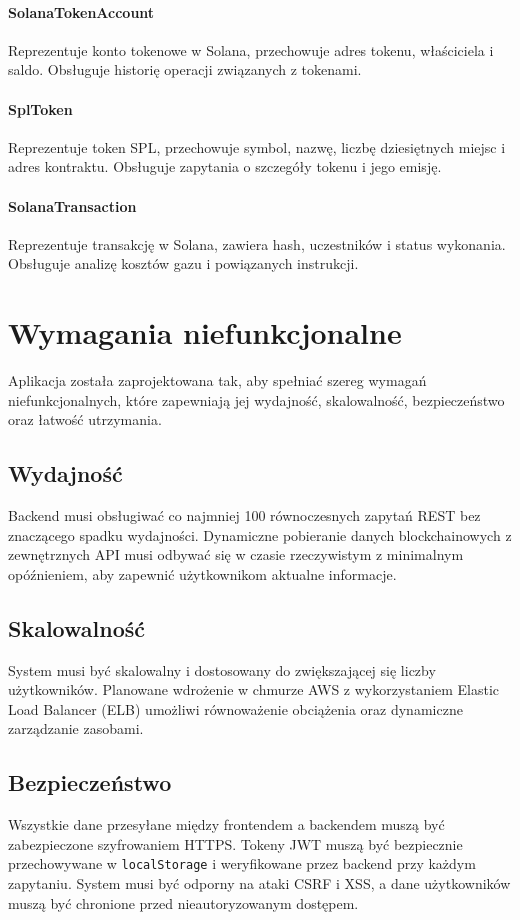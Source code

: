 \paragraph{SolanaTokenAccount} Reprezentuje konto tokenowe w Solana, przechowuje adres tokenu, właściciela i saldo. Obsługuje historię operacji związanych z tokenami.

\paragraph{SplToken} Reprezentuje token SPL, przechowuje symbol, nazwę, liczbę dziesiętnych miejsc i adres kontraktu. Obsługuje zapytania o szczegóły tokenu i jego emisję.

\paragraph{SolanaTransaction} Reprezentuje transakcję w Solana, zawiera hash, uczestników i status wykonania. Obsługuje analizę kosztów gazu i powiązanych instrukcji.




\section{Wymagania niefunkcjonalne}

Aplikacja została zaprojektowana tak, aby spełniać szereg wymagań niefunkcjonalnych, które zapewniają jej wydajność, skalowalność, bezpieczeństwo oraz łatwość utrzymania.

\subsection{Wydajność}
Backend musi obsługiwać co najmniej 100 równoczesnych zapytań REST bez znaczącego spadku wydajności. Dynamiczne pobieranie danych blockchainowych z zewnętrznych API musi odbywać się w czasie rzeczywistym z minimalnym opóźnieniem, aby zapewnić użytkownikom aktualne informacje.

\subsection{Skalowalność}
System musi być skalowalny i dostosowany do zwiększającej się liczby użytkowników. Planowane wdrożenie w chmurze AWS z wykorzystaniem Elastic Load Balancer (ELB) umożliwi równoważenie obciążenia oraz dynamiczne zarządzanie zasobami.

\subsection{Bezpieczeństwo}
Wszystkie dane przesyłane między frontendem a backendem muszą być zabezpieczone szyfrowaniem HTTPS. Tokeny JWT muszą być bezpiecznie przechowywane w \texttt{localStorage} i weryfikowane przez backend przy każdym zapytaniu. System musi być odporny na ataki CSRF i XSS, a dane użytkowników muszą być chronione przed nieautoryzowanym dostępem.

